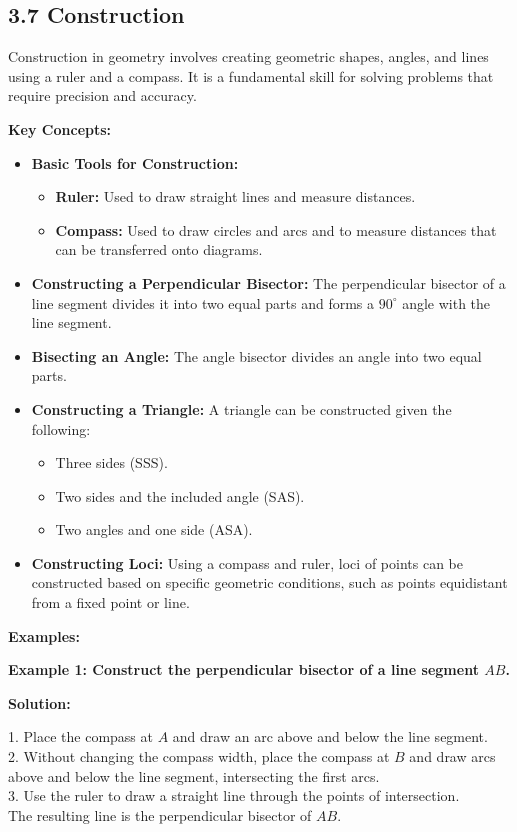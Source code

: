 

\subsection*{3.7 Construction}
Construction in geometry involves creating geometric shapes, angles, and lines using a ruler and a compass. It is a fundamental skill for solving problems that require precision and accuracy.

\textbf{Key Concepts:}
\begin{itemize}
	\item \textbf{Basic Tools for Construction:}
	\begin{itemize}
		\item \textbf{Ruler:} Used to draw straight lines and measure distances.
		\item \textbf{Compass:} Used to draw circles and arcs and to measure distances that can be transferred onto diagrams.
	\end{itemize}
	\item \textbf{Constructing a Perpendicular Bisector:}
	The perpendicular bisector of a line segment divides it into two equal parts and forms a $90^\circ$ angle with the line segment.
	\item \textbf{Bisecting an Angle:}
	The angle bisector divides an angle into two equal parts.
	\item \textbf{Constructing a Triangle:}
	A triangle can be constructed given the following:
	\begin{itemize}
		\item Three sides (SSS).
		\item Two sides and the included angle (SAS).
		\item Two angles and one side (ASA).
	\end{itemize}
	\item \textbf{Constructing Loci:}
	Using a compass and ruler, loci of points can be constructed based on specific geometric conditions, such as points equidistant from a fixed point or line.
\end{itemize}

\textbf{Examples:}

\begin{flushleft}
	\textbf{Example 1: Construct the perpendicular bisector of a line segment $AB$.}
	
	\vspace{0.5cm}
	\textbf{Solution:}
	\vspace{0.5cm}
	
	1. Place the compass at $A$ and draw an arc above and below the line segment. \\
	2. Without changing the compass width, place the compass at $B$ and draw arcs above and below the line segment, intersecting the first arcs. \\
	3. Use the ruler to draw a straight line through the points of intersection. \\
	The resulting line is the perpendicular bisector of $AB$.
\end{flushleft}

